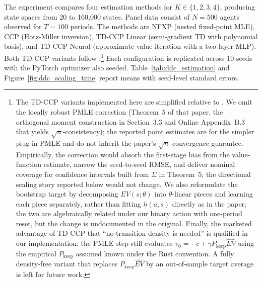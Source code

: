 The experiment compares four estimation methods for $K \in \{1,2,3,4\}$, producing state spaces from 20 to 160,000 states. Panel data consist of $N=500$ agents observed for $T=100$ periods. The methods are NFXP (nested fixed-point MLE), CCP (Hotz-Miller inversion), TD-CCP Linear (semi-gradient TD with polynomial basis), and TD-CCP Neural (approximate value iteration with a two-layer MLP). Both TD-CCP variants follow \citet{AdusumilliEckardt2022}.\footnote{The TD-CCP variants implemented here are simplified relative to \citet{AdusumilliEckardt2022}. We omit the locally robust PMLE correction (Theorem~5 of that paper, the orthogonal moment construction in Section~3.3 and Online Appendix~B.3 that yields $\sqrt{n}$-consistency); the reported point estimates are for the simpler plug-in PMLE and do not inherit the paper's $\sqrt{n}$-convergence guarantee. Empirically, the correction would absorb the first-stage bias from the value-function estimate, narrow the seed-to-seed RMSE, and deliver nominal coverage for confidence intervals built from $\Sigma$ in Theorem~5; the directional scaling story reported below would not change. We also reformulate the bootstrap target by decomposing $EV(s;\theta)$ into $\theta$-linear pieces and learning each piece separately, rather than fitting $h(a,s)$ directly as in the paper; the two are algebraically related under our binary action with one-period reset, but the change is undocumented in the original. Finally, the marketed advantage of TD-CCP that ``no transition density is needed'' is qualified in our implementation: the PMLE step still evaluates $v_0 = -c + \gamma P_{\text{keep}} \widehat{EV}$ using the empirical $P_{\text{keep}}$ assumed known under the Rust convention. A fully density-free variant that replaces $P_{\text{keep}} \widehat{EV}$ by an out-of-sample target average is left for future work.} Each configuration is replicated across 10 seeds with the PyTorch optimizer also seeded. Table~\ref{tab:ddc_estimation} and Figure~\ref{fig:ddc_scaling_time} report means with seed-level standard errors.

\begin{table}[t]
\centering
\caption{DDC estimation results across state-space scales. Rows show method, number of components $K$, state-space size $|\mathcal{S}|$, mean wall-clock time (seconds), RC bias, RC RMSE, and root mean squared error for $\theta_1$ and $\theta_2$. Standard errors in adjacent columns; means over 10 seeds, dashes indicate method failure (sparse state coverage).}
\label{tab:ddc_estimation}
\footnotesize

\end{table}

